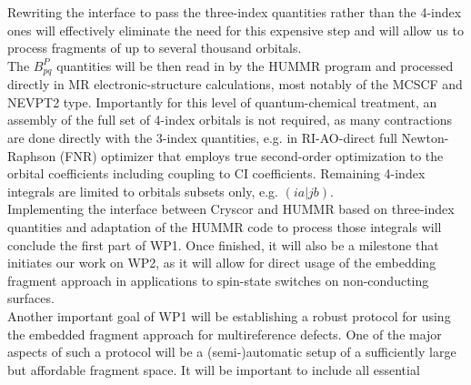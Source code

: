 \documentclass[a4paper,11pt,headings=normal]{scrartcl}
\begin{document}
\begin{itemize}
Rewriting the interface to 
pass the three-index quantities rather than the 4-index ones will effectively 
eliminate the need for this expensive step and will allow us to process 
fragments of up to several thousand orbitals.\\
The $B^P_{pq}$ quantities will be then read in by the HUMMR program 
and processed directly in MR electronic-structure calculations, most notably of 
the MCSCF and NEVPT2 type. Importantly for this level of quantum-chemical 
treatment, an assembly of the full set of 4-index orbitals is not required, as 
many contractions are done directly with the 3-index quantities, e.g. in 
RI-AO-direct full Newton-Raphson (FNR) optimizer that employs true second-order 
optimization to the orbital coefficients including coupling to CI 
coefficients.\autocite{Roemelt2025} Remaining 4-index integrals are limited to 
orbitals subsets only, e.g. $(ia|jb)$.\\
Implementing the interface between Cryscor and HUMMR based on 
three-index quantities and adaptation of the HUMMR code to process those 
integrals will conclude the first part of WP1. Once finished, it will also be a 
milestone that initiates our work on WP2, as it will allow for direct usage of 
the embedding fragment 
approach in applications to spin-state switches on non-conducting surfaces.\\
Another important goal of WP1 will be establishing a robust protocol for using 
the embedded fragment approach for multireference defects. One of the major aspects of such a protocol 
will be a (semi-)automatic setup of a sufficiently large but affordable 
fragment space. It will be important to include all essential 

\end{itemize}
\end{document}
